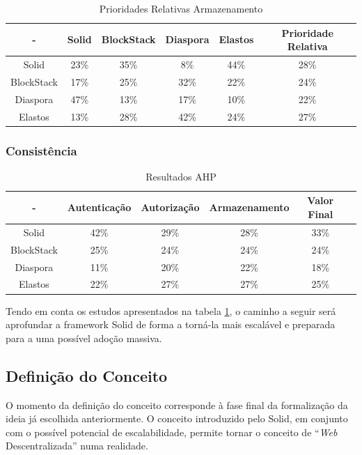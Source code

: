 \begin{table}[H]
\centering
\caption{Prioridades Relativas Armazenamento}
\vspace{0.5cm}
\begin{tabular}{c|c|c|c|c|c} 
 - & Solid & BlockStack & Diaspora & Elastos & Prioridade Relativa \\
\hline                               
Solid & 23\% & 35\% & 8\% & 44\% & 28\% \\
BlockStack &  17\% & 25\%	& 32\%	& 22\%	& 24\% \\
Diaspora &  47\% &	13\% & 17\%	& 10\% & 22\% \\
Elastos & 13\% & 28\% & 42\% & 24\% & 27\% \\
\end{tabular}
\end{table}

\subsubsection*{Consistência}

\begin{table}[h]
\centering
\caption{Resultados \acrshort{AHP}}
\label{tabela_resultados_ahp}
\vspace{0.5cm}
\begin{tabular}{c|c|c|c|c|c} 
 - & Autenticação & Autorização & Armazenamento & Valor Final & \\
\hline                               
Solid & 42\% &	29\% & 28\%	& 33\% & \\
BlockStack &  25\% & 24\% & 24\% & 24\% & \\
Diaspora &  11\% &	20\% & 22\% & 18\% & \\
Elastos & 22\% & 27\% & 27\% & 25\% & \\
\end{tabular}
\end{table}

Tendo em conta os estudos apresentados na tabela \ref{tabela_resultados_ahp}, o caminho a seguir será aprofundar a framework Solid de forma a torná-la mais escalável e preparada para a uma possível adoção massiva.

\subsection{Definição do Conceito}
O momento da definição do conceito corresponde à fase final da formalização da ideia já escolhida anteriormente. O conceito introduzido pelo Solid, em conjunto com o possível potencial de escalabilidade, permite tornar o conceito de “\emph{Web} Descentralizada” numa realidade.

